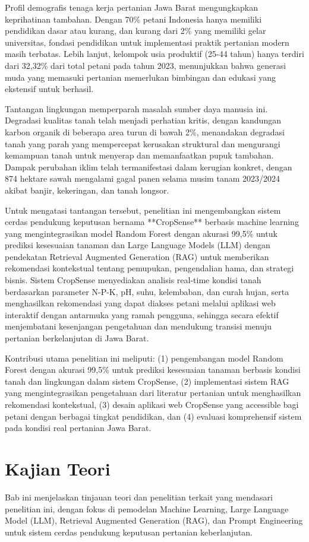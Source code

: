 \documentclass{article} %
\begin{document}
Profil demografis tenaga kerja pertanian Jawa Barat mengungkapkan keprihatinan tambahan. Dengan 70\% petani Indonesia hanya memiliki pendidikan dasar atau kurang, dan kurang dari 2\% yang memiliki gelar universitas, fondasi pendidikan untuk implementasi praktik pertanian modern masih terbatas. Lebih lanjut, kelompok usia produktif (25-44 tahun) hanya terdiri dari 32,32\% dari total petani pada tahun 2023, menunjukkan bahwa generasi muda yang memasuki pertanian memerlukan bimbingan dan edukasi yang ekstensif untuk berhasil.

Tantangan lingkungan memperparah masalah sumber daya manusia ini. Degradasi kualitas tanah telah menjadi perhatian kritis, dengan kandungan karbon organik di beberapa area turun di bawah 2\%, menandakan degradasi tanah yang parah yang mempercepat kerusakan struktural dan mengurangi kemampuan tanah untuk menyerap dan memanfaatkan pupuk tambahan. Dampak perubahan iklim telah termanifestasi dalam kerugian konkret, dengan 874 hektare sawah mengalami gagal panen selama musim tanam 2023/2024 akibat banjir, kekeringan, dan tanah longsor.

Untuk mengatasi tantangan tersebut, penelitian ini mengembangkan sistem cerdas pendukung keputusan bernama **CropSense** berbasis machine learning yang mengintegrasikan model Random Forest dengan akurasi 99,5\% untuk prediksi kesesuaian tanaman dan Large Language Models (LLM) dengan pendekatan Retrieval Augmented Generation (RAG) untuk memberikan rekomendasi kontekstual tentang pemupukan, pengendalian hama, dan strategi bisnis. Sistem CropSense menyediakan analisis real-time kondisi tanah berdasarkan parameter N-P-K, pH, suhu, kelembaban, dan curah hujan, serta menghasilkan rekomendasi yang dapat diakses petani melalui aplikasi web interaktif dengan antarmuka yang ramah pengguna, sehingga secara efektif menjembatani kesenjangan pengetahuan dan mendukung transisi menuju pertanian berkelanjutan di Jawa Barat.

Kontribusi utama penelitian ini meliputi: (1) pengembangan model Random Forest dengan akurasi 99,5\% untuk prediksi kesesuaian tanaman berbasis kondisi tanah dan lingkungan dalam sistem CropSense, (2) implementasi sistem RAG yang mengintegrasikan pengetahuan dari literatur pertanian untuk menghasilkan rekomendasi kontekstual, (3) desain aplikasi web CropSense yang accessible bagi petani dengan berbagai tingkat pendidikan, dan (4) evaluasi komprehensif sistem pada kondisi real pertanian Jawa Barat.

\section{Kajian Teori}
Bab ini menjelaskan tinjauan teori dan penelitian terkait yang mendasari penelitian ini, dengan fokus di pemodelan Machine Learning, Large Language Model (LLM), Retrieval Augmented Generation (RAG), dan Prompt Engineering untuk sistem cerdas pendukung keputusan pertanian keberlanjutan.
\end{document}

